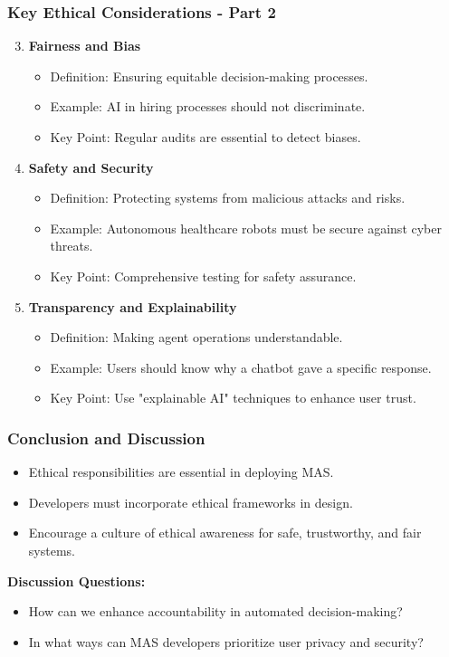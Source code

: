 \documentclass[aspectratio=169]{beamer}
\begin{document}
\begin{frame}[fragile]
    \frametitle{Key Ethical Considerations - Part 2}
    \begin{enumerate}
        \setcounter{enumi}{2} %
        \item \textbf{Fairness and Bias}
            \begin{itemize}
                \item Definition: Ensuring equitable decision-making processes.
                \item Example: AI in hiring processes should not discriminate.
                \item Key Point: Regular audits are essential to detect biases.
            \end{itemize}
        \item \textbf{Safety and Security}
            \begin{itemize}
                \item Definition: Protecting systems from malicious attacks and risks.
                \item Example: Autonomous healthcare robots must be secure against cyber threats.
                \item Key Point: Comprehensive testing for safety assurance.
            \end{itemize}
        \item \textbf{Transparency and Explainability}
            \begin{itemize}
                \item Definition: Making agent operations understandable.
                \item Example: Users should know why a chatbot gave a specific response.
                \item Key Point: Use "explainable AI" techniques to enhance user trust.
            \end{itemize}
    \end{enumerate}
\end{frame}

\begin{frame}[fragile]
    \frametitle{Conclusion and Discussion}
    \begin{itemize}
        \item Ethical responsibilities are essential in deploying MAS.
        \item Developers must incorporate ethical frameworks in design.
        \item Encourage a culture of ethical awareness for safe, trustworthy, and fair systems.
    \end{itemize}

    \textbf{Discussion Questions:}
    \begin{itemize}
        \item How can we enhance accountability in automated decision-making?
        \item In what ways can MAS developers prioritize user privacy and security?
    \end{itemize}
\end{frame}
\end{document}
